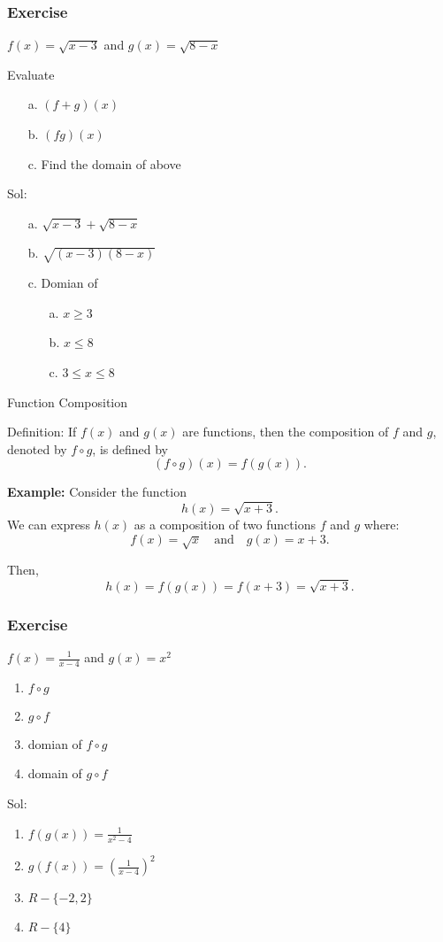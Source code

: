   \begin{frame}
    \frametitle{Exercise }
    \( f(x)  = \sqrt{x-3}\) and \(g(x) = \sqrt{8 - x }\)
    
    Evaluate
    \begin{enumerate}
      \item[a.] \((f+g)(x)\)  
      \item[b.]  \((fg)(x)\)
      \item[c.] Find the domain of above 
    \end{enumerate}
  \pause 
  Sol: 
  \begin{enumerate}
    \item[a.] \(\sqrt{x-3} + \sqrt{8-x} \) 
    \item[b.] \(\sqrt{(x-3)(8-x)} \)  
    \item[c.]  Domian of \begin{enumerate}
      \item[a.] \(x\geq 3 \)  
      \item[b.] \(x \leq 8 \)  
      \item[c.] \( 3 \leq x \leq 8 \)    
    \end{enumerate}
  \end{enumerate}
\end{frame}
  \begin{frame}{Function Composition }
    \begin{block}{Definition:}  
    If \( f(x) \) and \( g(x) \) are functions, then the composition of \( f \) and \( g \), denoted by \( f \circ g \), is defined by
    \[
      (f \circ g)(x) = f(g(x)).
    \]
    \end{block}
    \medskip
    
    \textbf{Example:}
    Consider the function
    \[
      h(x) = \sqrt{x+3}.
    \]
    We can express \( h(x) \) as a composition of two functions \( f \) and \( g \) where:
    \[
      f(x) = \sqrt{x} \quad \text{and} \quad g(x) = x+3.
    \]
    
    Then,
    \[
      h(x) = f(g(x)) = f(x+3) = \sqrt{x+3}.
    \]
  \end{frame}
\begin{frame}
  \frametitle{Exercise}
  \(
  f(x) = \frac{1}{x-4} 
  \) and \( g(x) = x^{2} \) 
  \begin{enumerate}
    \item \(f \circ g \)  
    \item \( g \circ f \)   
    \item domian of \(f \circ g \) 
    \item domain of \( g \circ f \) 
  \end{enumerate}
  Sol: \pause 
  \begin{enumerate}
    \item  \(f(g(x)) = \frac{1}{x^{2} - 4}\)
    \item \(g(f(x)) = (\frac{1}{x-4})^{2}\) 
    \item \(R - \{-2,2\} \)  
    \item \(R - \{4\} \)  
  \end{enumerate}
\end{frame}
